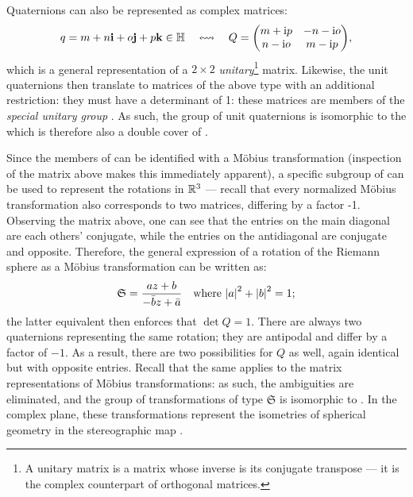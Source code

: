 Quaternions can also be represented as complex matrices: \cite{Stillwell2008}
\[ q = \quat{m}{n}{o}{p} \in \quaternions \corresponds Q = \mqty(m + \ii p & -n - \ii o\\n - \ii o & m - \ii p),\]
which is a general representation of a \(2\times 2\) \emph{unitary}\footnote{A unitary matrix is a matrix whose inverse is its conjugate transpose --- it is the complex counterpart of orthogonal matrices.} matrix. Likewise, the unit quaternions then translate to matrices of the above type with an additional restriction: they must have a determinant of 1: these matrices are members of the \emph{special unitary group} . As such, the group of unit quaternions is isomorphic to the  which is therefore also a double cover of \sogroup.

Since the members of  can be identified with a Möbius transformation (inspection of the matrix above makes this immediately apparent), a specific subgroup of \moebiusgroup can be used to represent the rotations in \(\mathbb{R}^3\) --- recall that every normalized Möbius transformation also corresponds to two matrices, differing by a factor -1. Observing the matrix above, one can see that the entries on the main diagonal are each others' conjugate, while the entries on the antidiagonal are conjugate and opposite. Therefore, the general expression of a rotation of the Riemann sphere as a Möbius transformation can be written as: \cite{Needham2021}
\[\mathfrak{S} = \frac{az + b}{-\bar{b}z+\bar{a}}\quad\text{where } \abs{a}^2 + \abs{b}^2 = 1; \]
the latter equivalent then enforces that \(\det Q = 1\). There are always two quaternions representing the same rotation; they are antipodal and differ by a factor of \(-1\). As a result, there are two possibilities for \(Q\) as well, again identical but with opposite entries. Recall that the same applies to the matrix representations of Möbius transformations: as such, the ambiguities are eliminated, and the group of transformations of type \(\mathfrak{S}\) is isomorphic to \sogroup. In the complex plane, these transformations represent the isometries of spherical geometry in the stereographic map \cite{Needham1997}. 



